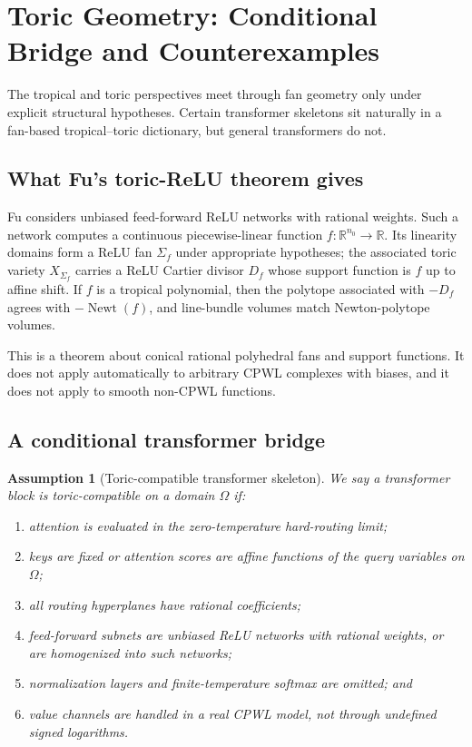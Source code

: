\documentclass[11pt]{article}
\newtheorem{assumption}[theorem]{Assumption}
\DeclareMathOperator{\Newt}{Newt}
\newcommand{\R}{\mathbb{R}}
\begin{document}
\section{Toric Geometry: Conditional Bridge and Counterexamples}
\label{sec:toric}

The tropical and toric perspectives meet through fan geometry only under explicit structural hypotheses.  Certain transformer skeletons sit naturally in a fan-based tropical--toric dictionary, but general transformers do not.

\subsection{What Fu's toric-ReLU theorem gives}

Fu \cite{fu2025toricrelu} considers unbiased feed-forward ReLU networks with rational weights.  Such a network computes a continuous piecewise-linear function $f:\R^{n_0}\to\R$.  Its linearity domains form a ReLU fan $\Sigma_f$ under appropriate hypotheses; the associated toric variety $X_{\Sigma_f}$ carries a ReLU Cartier divisor $D_f$ whose support function is $f$ up to affine shift.  If $f$ is a tropical polynomial, then the polytope associated with $-D_f$ agrees with $-\Newt(f)$, and line-bundle volumes match Newton-polytope volumes.

This is a theorem about conical rational polyhedral fans and support functions.  It does not apply automatically to arbitrary CPWL complexes with biases, and it does not apply to smooth non-CPWL functions.

\subsection{A conditional transformer bridge}

\begin{assumption}[Toric-compatible transformer skeleton]
\label{ass:toric-compatible}
We say a transformer block is toric-compatible on a domain $\Omega$ if:
\begin{enumerate}
  \item attention is evaluated in the zero-temperature hard-routing limit;
  \item keys are fixed or attention scores are affine functions of the query variables on $\Omega$;
  \item all routing hyperplanes have rational coefficients;
  \item feed-forward subnets are unbiased ReLU networks with rational weights, or are homogenized into such networks;
  \item normalization layers and finite-temperature softmax are omitted; and
  \item value channels are handled in a real CPWL model, not through undefined signed logarithms.
\end{enumerate}
\end{assumption}
\end{document}
